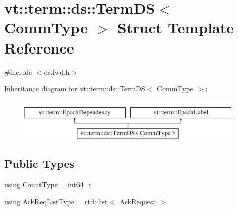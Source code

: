 \hypertarget{structvt_1_1term_1_1ds_1_1_term_d_s}{}\section{vt\+:\+:term\+:\+:ds\+:\+:Term\+DS$<$ Comm\+Type $>$ Struct Template Reference}
\label{structvt_1_1term_1_1ds_1_1_term_d_s}


{\ttfamily \#include $<$ds.\+fwd.\+h$>$}

Inheritance diagram for vt\+:\+:term\+:\+:ds\+:\+:Term\+DS$<$ Comm\+Type $>$\+:\begin{figure}[H]
\begin{center}
\leavevmode
\includegraphics[height=2.000000cm]{structvt_1_1term_1_1ds_1_1_term_d_s}
\end{center}
\end{figure}
\subsection*{Public Types}
\begin{DoxyCompactItemize}
\item 
using \hyperlink{structvt_1_1term_1_1ds_1_1_term_d_s_a54f4ebd7e1ecb59c32c0f5b03ef9f20b}{Count\+Type} = int64\+\_\+t
\item 
using \hyperlink{structvt_1_1term_1_1ds_1_1_term_d_s_a9d4102aa0577c3b077befc48c1a88842}{Ack\+Req\+List\+Type} = std\+::list$<$ \hyperlink{structvt_1_1term_1_1ds_1_1_ack_request}{Ack\+Request} $>$
\end{DoxyCompactItemize}
